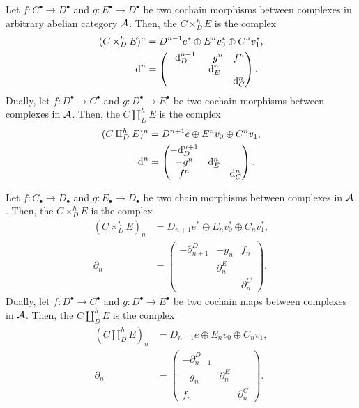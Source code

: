 {Let $f\colon C^{\bullet}\to D^{\bullet}$ 
and $g\colon E^{\bullet}\to D^{\bullet}$
be two cochain morphisms between complexes in arbitrary 
abelian category ${\cal A}$. 
Then, the  $C\times^h_DE$ 
is the complex 
\begin{align*}
(C\times^h_DE)^n &= 
D^{n-1}e^{\ast}\oplus E^nv_0^{\ast}\oplus C^nv_1^{\ast}, \\
\mathrm{d}^n &= 
\begin{pmatrix}
-\mathrm{d}_D^{n-1} & -g^n & f^n \\
 & \mathrm{d}_E^n & \\
 &  & \mathrm{d}_C^n
\end{pmatrix}.
\end{align*}
Dually, let $f\colon D^{\bullet}\to C^{\bullet}$ 
and $g\colon D^{\bullet}\to E^{\bullet}$
be two cochain morphisms between complexes in ${\cal A}$. 
Then, the  $C\amalg^h_DE$ 
is the complex 
\begin{align*}
(C\amalg^h_DE)^n &= 
D^{n+1}e\oplus E^nv_0\oplus C^nv_1, \\
\mathrm{d}^n &= 
\begin{pmatrix}
-\mathrm{d}_D^{n+1} & & \\
-g^n & \mathrm{d}_E^n & \\
f^n &  & \mathrm{d}_C^n
\end{pmatrix}.
\end{align*}

Let $f\colon C_{\bullet}\to D_{\bullet}$ 
and $g\colon E_{\bullet}\to D_{\bullet}$
be two chain morphisms between complexes in ${\cal A}$. 
Then, the  $C\times^h_DE$ 
is the complex 
\begin{align*}
(C\times^h_DE)_n &= 
D_{n+1}e^{\ast}\oplus E_nv_0^{\ast}\oplus C_nv_1^{\ast}, \\
\partial_n &= 
\begin{pmatrix}
-\partial^D_{n+1} & -g_n & f_n \\
 & \partial^E_n & \\
 &  & \partial^C_n
\end{pmatrix}.
\end{align*}
Dually, let $f\colon D^{\bullet}\to C^{\bullet}$ 
and $g\colon D^{\bullet}\to E^{\bullet}$
be two cochain maps between complexes in ${\cal A}$. 
Then, the  $C\amalg^h_DE$ 
is the complex 
\begin{align*}
(C\amalg^h_DE)_n &= 
D_{n-1}e\oplus E_nv_0\oplus C_nv_1, \\
\partial_n &= 
\begin{pmatrix}
-\partial^D_{n-1} & & \\
-g_n & \partial^E_n & \\
f_n &  & \partial^C_n
\end{pmatrix}.
\end{align*}

}

